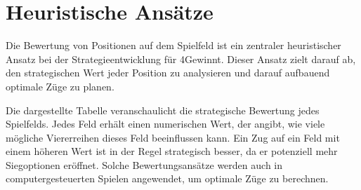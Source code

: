 \section{Heuristische Ansätze}

Die Bewertung von Positionen auf dem Spielfeld ist ein zentraler heuristischer Ansatz bei der Strategieentwicklung für 4Gewinnt. Dieser Ansatz zielt darauf ab, den strategischen Wert jeder Position zu analysieren und darauf aufbauend optimale Züge zu planen.

Die dargestellte Tabelle veranschaulicht die strategische Bewertung jedes Spielfelds. Jedes Feld erhält einen numerischen Wert, der angibt, wie viele mögliche Viererreihen dieses Feld beeinflussen kann. Ein Zug auf ein Feld mit einem höheren Wert ist in der Regel strategisch besser, da er potenziell mehr Siegoptionen eröffnet. Solche Bewertungsansätze werden auch in computergesteuerten Spielen angewendet, um optimale Züge zu berechnen.

